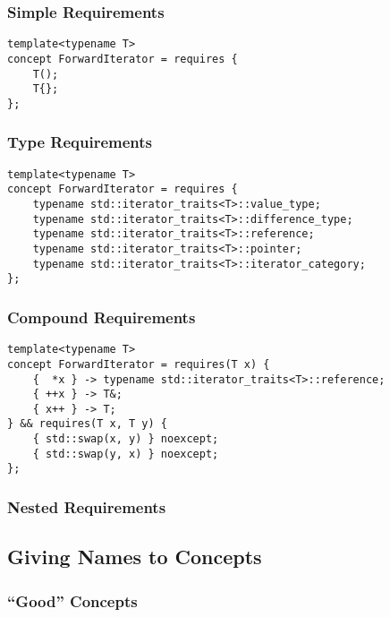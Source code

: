         

        \subsubsection*{Simple Requirements} \label{sec:simple_requirements}

        \begin{lstlisting}
template<typename T>
concept ForwardIterator = requires {
    T();
    T{};
}; \end{lstlisting}

        \subsubsection*{Type Requirements} \label{sec:type_requirements}

        \begin{lstlisting}
template<typename T>
concept ForwardIterator = requires {
    typename std::iterator_traits<T>::value_type;
    typename std::iterator_traits<T>::difference_type;
    typename std::iterator_traits<T>::reference;
    typename std::iterator_traits<T>::pointer;
    typename std::iterator_traits<T>::iterator_category;
}; \end{lstlisting}

        \subsubsection*{Compound Requirements} \label{sec:compound_requirements}

        \begin{lstlisting}
template<typename T>
concept ForwardIterator = requires(T x) {
    {  *x } -> typename std::iterator_traits<T>::reference;
    { ++x } -> T&;
    { x++ } -> T;
} && requires(T x, T y) {
    { std::swap(x, y) } noexcept;
    { std::swap(y, x) } noexcept;
}; \end{lstlisting}

        \subsubsection*{Nested Requirements} \label{sec:nested_requirements}

        

\subsection{Giving Names to Concepts} \label{sec:giving_names_to_concepts}

    

    

    \subsubsection{``Good'' Concepts} \label{sec:good_concepts}
